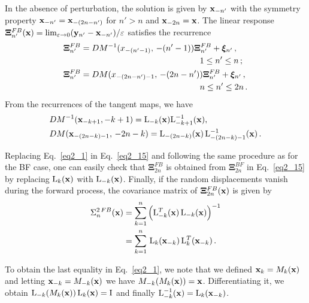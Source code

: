 \begin{chapterappendices}{}
In the absence of perturbation, the solution is given by $\vb{x}_{-n'}$ with the symmetry property
$\vb{x}_{-n'}=\vb{x}_{-(2n-n')}$ for $n'>n$ and $\vb{x}_{-2n}=\vb{x}$. The linear response
$\boldsymbol{\Xi}^{FB}_{n'}(\vb{x})= \lim_{\varepsilon\to 0}(\vb{y}_{n'}-\vb{x}_{-n'})/\varepsilon$ satisfies the recurrence 
%
%
\begin{equation}
 \begin{split}
   \boldsymbol{\Xi}^{FB}_{n'}  &= DM^{-1}(x_{-(n'-1)},\,-(n'-1))\boldsymbol{\Xi}^{FB}_{n'}+ \boldsymbol{\xi}_{n'} \, ,  \\
   & \hskip 5 truecm 1\le n'\le n \, ; \\
   \boldsymbol{\Xi}^{FB}_{n'}  &= DM(x_{-(2n-n')-1},\,-(2n-n'))\boldsymbol{\Xi}^{FB}_{n'}+ \boldsymbol{\xi}_{n'} \, ,  \\
  & \hskip 5 truecm  n\le n'\le 2n \, .
  \end{split}
\label{eq2_15}
\end{equation}
%
From the recurrences of the tangent maps, we have
%
\begin{equation}
 \begin{aligned}
   & DM^{-1}(\vb{x}_{-k+1}, - k+1) =  \mathrm{L}_{-k}(\vb{x}) \mathrm{L}_{-k+1}^{-1}(\vb{x}), \\
   & DM(\vb{x}_{-(2n-k)-1},\,-2n-k) =   \mathrm{L}_{-(2n-k)}(\vb{x})\,\mathrm{L}^{-1}_{-(2n-k)-1} (\vb{x}) \, .
  \end{aligned}
\label{eq2_16}
\end{equation}
%

Replacing Eq.~\eqref{eq2_1} in Eq.~\eqref{eq2_15} and following the same procedure as for the BF
case, one can easily check that $\boldsymbol{\Xi}^{FB}_{2n}$  is obtained from $\boldsymbol{\Xi}^{BF}_{2n}$
in Eq.~\eqref{eq2_15} by replacing $\mathrm{L}_k(\vb{x})$ with $\mathrm{L}_{-k}(\vb{x})$. Finally,  if the
random displacements vanish during the forward process, the covariance matrix of $\boldsymbol{\Xi}_{2n}^{FB}(\vb{x})$
is given by 
%
\begin{equation}
 \begin{split}
   \Sigma^{2\,FB}_{n}(\vb{x}) & =  \sum_{k=1}^{n}\,\Bigl( \mathrm{L}_{-k}^T(\vb{x})
   \,\mathrm{L}_{-k}(\vb{x})  \Bigr)^{-1} \\
     & = \sum_{k=1}^{n}\, \mathrm{L}_{k}(\vb{x}_{-k})\, \mathrm{L}_{k}^T(\vb{x}_{-k}) \,.
 \end{split}
\label{eq2_17}
\end{equation}
%

To obtain the last equality in Eq.~\eqref{eq2_1}, we note that we defined $\vb{x}_k=M_k(\vb{x})$
and letting $\vb{x}_{-k}= M_{-k}(\vb{x})$
we have $M_{-k}(M_k(\vb{x}))=\vb{x}$. Differentiating it, we obtain
$\mathrm{L}_{-k}(M_k(\vb{x}))\,\mathrm{L}_k(\vb{x})=\mathrm{I}$  and finally $\mathrm{L}_{-k}^{-1}(\vb{x})= \mathrm{L}_k(\vb{x}_{-k})$.


\end{chapterappendices}

